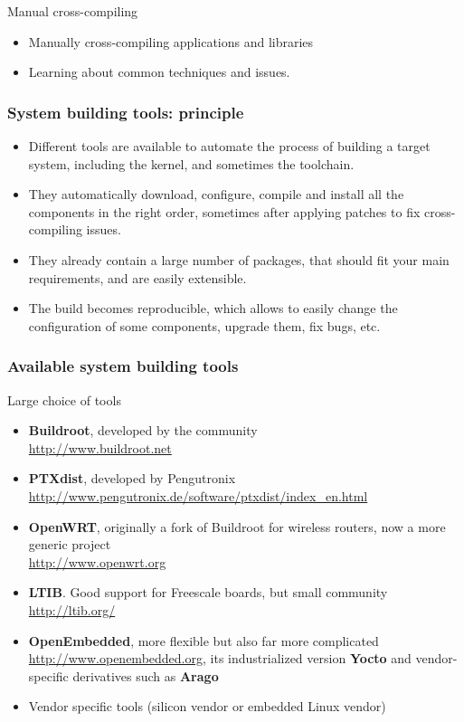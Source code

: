\setuplabframe
{Manual cross-compiling}
{
  \begin{itemize}
  \item Manually cross-compiling applications and libraries
  \item Learning about common techniques and issues.
  \end{itemize}
}

\begin{frame}
  \frametitle{System building tools: principle}
  \begin{itemize}
  \item Different tools are available to automate the process of
    building a target system, including the kernel, and sometimes the
    toolchain.
  \item They automatically download, configure, compile and install
    all the components in the right order, sometimes after applying
    patches to fix cross- compiling issues.
  \item They already contain a large number of packages, that should
    fit your main requirements, and are easily extensible.
  \item The build becomes reproducible, which allows to easily change
    the configuration of some components, upgrade them, fix bugs, etc.
  \end{itemize}
\end{frame}

\begin{frame}
  \frametitle{Available system building tools} Large choice of tools
  \small
  \begin{itemize}
  \item {\bf Buildroot}, developed by the community\\
    \url{http://www.buildroot.net}
  \item {\bf PTXdist}, developed by Pengutronix\\
    \url{http://www.pengutronix.de/software/ptxdist/index_en.html}
  \item {\bf OpenWRT}, originally a fork of Buildroot for wireless routers,
    now a more generic project\\
    \url{http://www.openwrt.org}
  \item {\bf LTIB}. Good support for Freescale boards, but small community\\
    \url{http://ltib.org/}
  \item {\bf OpenEmbedded}, more flexible but also far more complicated\\
    \url{http://www.openembedded.org}, its industrialized version {\bf
      Yocto} and vendor-specific derivatives such as {\bf Arago}
  \item Vendor specific tools (silicon vendor or embedded Linux
    vendor)
  \end{itemize}
\end{frame}


